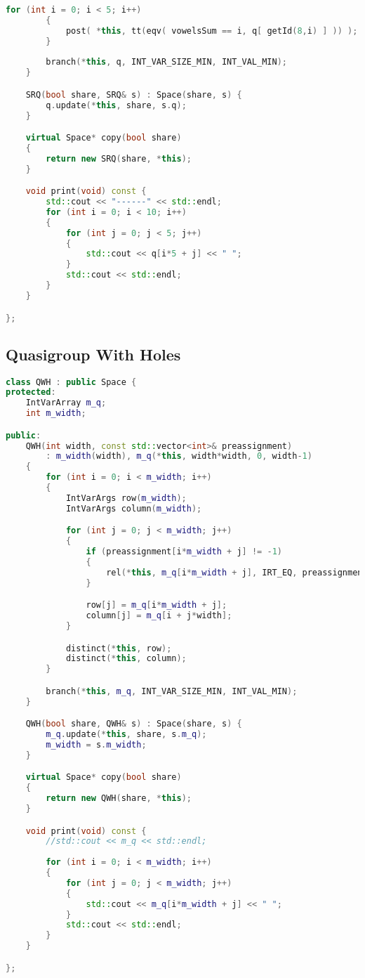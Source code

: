 \begin{lstlisting}[language=C++]
		for (int i = 0; i < 5; i++)
		{
			post( *this, tt(eqv( vowelsSum == i, q[ getId(8,i) ] )) );
		}
		
		branch(*this, q, INT_VAR_SIZE_MIN, INT_VAL_MIN);
	}

	SRQ(bool share, SRQ& s) : Space(share, s) {
		q.update(*this, share, s.q);
	}

	virtual Space* copy(bool share)
	{
		return new SRQ(share, *this);
	}

	void print(void) const {
		std::cout << "------" << std::endl;
		for (int i = 0; i < 10; i++)
		{
			for (int j = 0; j < 5; j++)
			{
				std::cout << q[i*5 + j] << " ";
			}
			std::cout << std::endl;
		}
	}

};
\end{lstlisting}

\subsection{Quasigroup With Holes}
\begin{lstlisting}[language=C++]
class QWH : public Space {
protected: 
	IntVarArray m_q;
	int m_width;

public:
	QWH(int width, const std::vector<int>& preassignment) 
		: m_width(width), m_q(*this, width*width, 0, width-1)
	{
		for (int i = 0; i < m_width; i++)
		{
			IntVarArgs row(m_width);
			IntVarArgs column(m_width);

			for (int j = 0; j < m_width; j++)
			{
				if (preassignment[i*m_width + j] != -1)
				{
					rel(*this, m_q[i*m_width + j], IRT_EQ, preassignment[i*m_width + j]);
				}

				row[j] = m_q[i*m_width + j];
				column[j] = m_q[i + j*width];
			}

			distinct(*this, row);
			distinct(*this, column);
		}

		branch(*this, m_q, INT_VAR_SIZE_MIN, INT_VAL_MIN);
	}

	QWH(bool share, QWH& s) : Space(share, s) {
		m_q.update(*this, share, s.m_q);
		m_width = s.m_width;
	}

	virtual Space* copy(bool share)
	{
		return new QWH(share, *this);
	}

	void print(void) const {
		//std::cout << m_q << std::endl;
		
		for (int i = 0; i < m_width; i++)
		{
			for (int j = 0; j < m_width; j++)
			{
				std::cout << m_q[i*m_width + j] << " ";
			}
			std::cout << std::endl;
		}
	}

};
\end{lstlisting}

